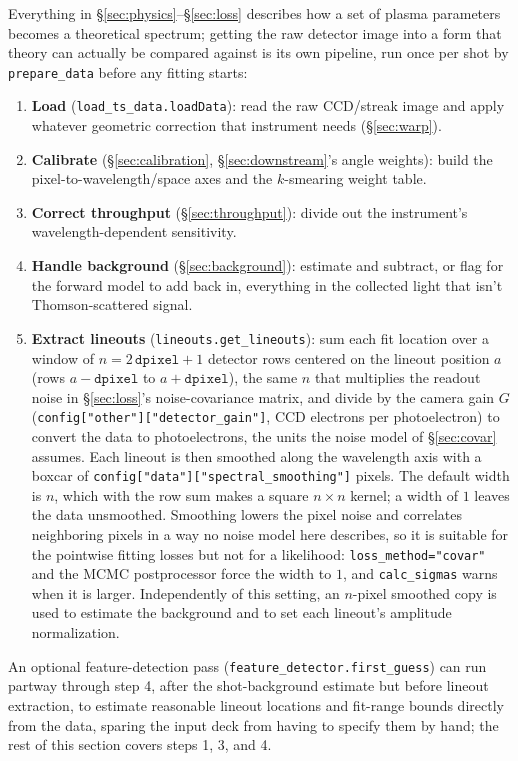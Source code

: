 \documentclass[11pt]{article}
\newcommand{\code}[1]{\texttt{#1}}
\begin{document}
Everything in \S\ref{sec:physics}--\S\ref{sec:loss} describes how a set of plasma
parameters becomes a theoretical spectrum; getting the raw detector image into a form that
theory can actually be compared against is its own pipeline, run once per shot by
\code{prepare\_data} before any fitting starts:
\begin{enumerate}
  \item \textbf{Load} (\code{load\_ts\_data.loadData}): read the raw CCD/streak image and
    apply whatever geometric correction that instrument needs (\S\ref{sec:warp}).
  \item \textbf{Calibrate} (\S\ref{sec:calibration}, \S\ref{sec:downstream}'s angle
    weights): build the pixel-to-wavelength/space axes and the $k$-smearing weight table.
  \item \textbf{Correct throughput} (\S\ref{sec:throughput}): divide out the instrument's
    wavelength-dependent sensitivity.
  \item \textbf{Handle background} (\S\ref{sec:background}): estimate and subtract, or flag
    for the forward model to add back in, everything in the collected light that isn't
    Thomson-scattered signal.
  \item \textbf{Extract lineouts} (\code{lineouts.get\_lineouts}): sum each fit location
    over a window of $n=2\,\code{dpixel}+1$ detector rows centered on the lineout
    position $a$ (rows $a-\code{dpixel}$ to $a+\code{dpixel}$), the same $n$ that
    multiplies the readout noise in \S\ref{sec:loss}'s noise-covariance matrix, and divide
    by the camera gain $G$ (\code{config["other"]["detector\_gain"]}, CCD electrons per
    photoelectron) to convert the data to photoelectrons, the units the noise model of
    \S\ref{sec:covar} assumes. Each lineout is then smoothed along the wavelength axis
    with a boxcar of \code{config["data"]["spectral\_smoothing"]} pixels. The default
    width is $n$, which with the row sum makes a square $n\times n$ kernel; a width of
    $1$ leaves the data unsmoothed. Smoothing lowers the pixel noise and correlates
    neighboring pixels in a way no noise model here describes, so it is suitable for the
    pointwise fitting losses but not for a likelihood: \code{loss\_method="covar"} and
    the MCMC postprocessor force the width to $1$, and \code{calc\_sigmas} warns when it
    is larger. Independently of this setting, an $n$-pixel smoothed copy is used to
    estimate the background and to set each lineout's amplitude normalization.
\end{enumerate}
An optional feature-detection pass (\code{feature\_detector.first\_guess}) can run partway
through step 4, after the shot-background estimate but before lineout extraction, to
estimate reasonable lineout locations and fit-range bounds directly from the data, sparing
the input deck from having to specify them by hand; the rest of this section covers steps
1, 3, and 4.
\end{document}
